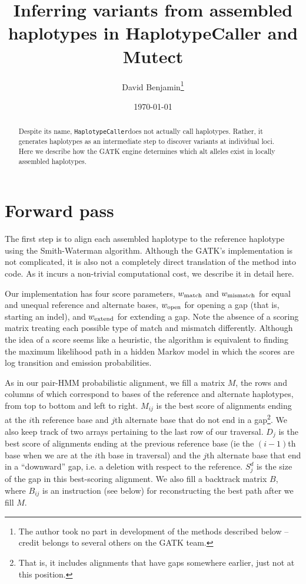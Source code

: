 \documentclass[nofootinbib,amssymb,amsmath]{revtex4}
\newcommand{\HC}{\texttt{HaplotypeCaller}}
\begin{document}
\title{Inferring variants from assembled haplotypes in HaplotypeCaller and Mutect}
\author{David Benjamin\footnote{The author took no part in development of the methods described below -- credit belongs to several others on the GATK team. }}

\date{\today}

\begin{abstract}
Despite its name, \HC does not actually call haplotypes.  Rather, it generates haplotypes as an intermediate step to discover variants at individual loci.  Here we describe how the GATK engine determines which alt alleles exist in locally assembled haplotypes.
\end{abstract}

\maketitle

\section{Forward pass}
The first step is to align each assembled haplotype to the reference haplotype using the Smith-Waterman algorithm.  Although the GATK's implementation is not complicated, it is also not a completely direct translation of the method into code.  As it incurs a non-trivial computational cost, we describe it in detail here.

Our implementation has four score parameters, $w_{\rm match}$ and $w_{\rm mismatch}$ for equal and unequal reference and alternate bases, $w_{\rm open}$ for opening a gap (that is, starting an indel), and $w_{\rm extend}$ for extending a gap.  Note the absence of a scoring matrix treating each possible type of match and mismatch differently.  Although the idea of a score seems like a heuristic, the algorithm is equivalent to finding the maximum likelihood path in a hidden Markov model in which the scores are log transition and emission probabilities.  

As in our pair-HMM probabilistic alignment, we fill a matrix $M$, the rows and columns of which correspond to bases of the reference and alternate haplotypes, from top to bottom and left to right.  $M_{ij}$ is the best score of alignments ending at the $i$th reference base and $j$th alternate base that do not end in a gap\footnote{That is, it includes alignments that have gaps somewhere earlier, just not at this position.}.  We also keep track of two arrays pertaining to the last row of our traversal.  $D_j$ is the best score of alignments ending at the previous reference base (ie the $(i-1)$th base when we are at the $i$th base in traversal) and the $j$th alternate base that end in a ``downward'' gap, i.e. a deletion with respect to the reference.  $S^d_j$ is the size of the gap in this best-scoring alignment.  We also fill a backtrack matrix $B$, where $B_{ij}$ is an instruction (see below) for reconstructing the best path after we fill $M$.
\end{document}
